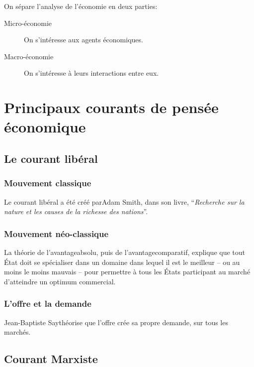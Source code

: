 \documentclass[10pt,a4paper,french]{article}
\begin{document}
On sépare l'analyse de l'économie en deux parties:
\begin{description}
\item[Micro-économie] On s'intéresse aux agents économiques.
\item[Macro-économie] On s'intéresse à leurs interactions entre eux.
\end{description}

\section{Principaux courants de pensée économique}

\subsection{Le courant libéral}

\subsubsection{Mouvement classique}

Le courant libéral a été créé parAdam Smith, dans son livre, ``\textit{Recherche sur la nature et les causes de la richesse des nations}''.

\subsubsection{Mouvement néo-classique}

La théorie de l’avantageabsolu, puis de l’avantagecomparatif, explique que tout État doit se spécialiser dans un domaine dans lequel il est le meilleur – ou au moins le moins mauvais – pour permettre à tous les États participant au marché d’atteindre un optimum commercial.

\subsubsection{L'offre et la demande}

Jean-Baptiste Saythéorise que l'offre crée sa propre demande, sur tous les marchés.

\subsection{Courant Marxiste}
\end{document}
